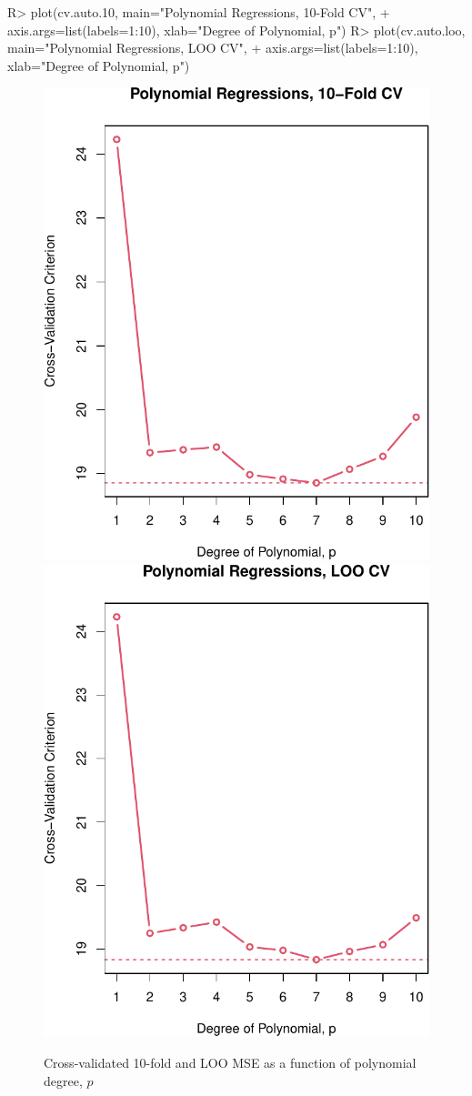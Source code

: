 \documentclass[
]{jss}
\begin{document}
\begin{CodeChunk}
\begin{CodeInput}
R> plot(cv.auto.10, main="Polynomial Regressions, 10-Fold CV",
+      axis.args=list(labels=1:10), xlab="Degree of Polynomial, p")
R> plot(cv.auto.loo, main="Polynomial Regressions, LOO CV",
+      axis.args=list(labels=1:10), xlab="Degree of Polynomial, p")
\end{CodeInput}
\begin{figure}

{\centering \includegraphics[width=0.45\linewidth]{JSS-article_files/figure-latex/polynomial-regression-CV-graph-2-1} \includegraphics[width=0.45\linewidth]{JSS-article_files/figure-latex/polynomial-regression-CV-graph-2-2} 

}

\caption[Cross-validated 10-fold and LOO MSE as a function of polynomial degree, $p$]{Cross-validated 10-fold and LOO MSE as a function of polynomial degree, $p$}\label{fig:polynomial-regression-CV-graph-2}
\end{figure}
\end{CodeChunk}
\end{document}
